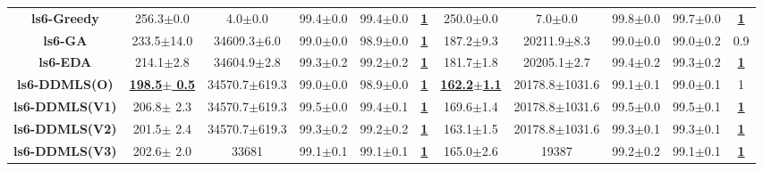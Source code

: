 \documentclass[lettersize,journal]{IEEEtran}
\begin{document}
\begin{table}[!t]
{\begin{tabular}{ccccccccccc}
    \midrule
    {\bfseries ls6-Greedy} &256.3$\pm$0.0 &4.0$\pm$0.0 & 99.4$\pm$0.0 &99.4$\pm$0.0 &\underline{\bfseries 1} &250.0$\pm$0.0 &7.0$\pm$0.0& 99.8$\pm$0.0 &99.7$\pm$0.0 &\underline{\bfseries 1} \\
    {\bfseries ls6-GA} &233.5$\pm$14.0 &34609.3$\pm$6.0 & 99.0$\pm$0.0 &98.9$\pm$0.0 &\underline{\bfseries 1} &187.2$\pm$9.3 &20211.9$\pm$8.3& 99.0$\pm$0.0 &99.0$\pm$0.2 &0.9 \\
    {\bfseries ls6-EDA} &214.1$\pm$2.8 &34604.9$\pm$2.8 & 99.3$\pm$0.2 &99.2$\pm$0.2 &\underline{\bfseries 1} &181.7$\pm$1.8 &20205.1$\pm$2.7& 99.4$\pm$0.2 &99.3$\pm$0.2 &\underline{\bfseries 1} \\
    \bfseries ls6-DDMLS(O) &\underline{\bfseries 198.5$\pm$ 0.5} & 34570.7$\pm$619.3 &99.0$\pm$0.0 &98.9$\pm$0.0 &\underline{\bfseries 1} &\underline{\bfseries 162.2$\pm$1.1} &20178.8$\pm$1031.6 &99.1$\pm$0.1& 99.0$\pm$0.1 &\underline{\bfseries }1 \\
    {\bfseries ls6-DDMLS(V1)} &206.8$\pm$ 2.3 & 34570.7$\pm$619.3 &99.5$\pm$0.0 &99.4$\pm$0.1 &\underline{\bfseries 1}  &169.6$\pm$1.4 &20178.8$\pm$1031.6 &99.5$\pm$0.0& 99.5$\pm$0.1 &\underline{\bfseries 1} \\
    {\bfseries ls6-DDMLS(V2)} &201.5$\pm$ 2.4 & 34570.7$\pm$619.3 &99.3$\pm$0.2 &99.2$\pm$0.2 &\underline{\bfseries 1}  &163.1$\pm$1.5 &20178.8$\pm$1031.6 &99.3$\pm$0.1& 99.3$\pm$0.1 &\underline{\bfseries 1} \\
    {\bfseries ls6-DDMLS(V3)} &202.6$\pm$ 2.0 & 33681 &99.1$\pm$0.1 &99.1$\pm$0.1 &\underline{\bfseries 1}  &165.0$\pm$2.6 &19387 &99.2$\pm$0.2& 99.1$\pm$0.1 &\underline{\bfseries 1} \\

    \bottomrule
    \end{tabular}
    }
\label{fullresult:LAB}
\end{table}
\end{document}
